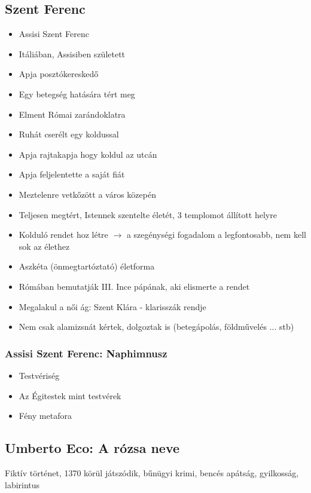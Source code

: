 \documentclass{article}
\begin{document}
\subsection{Szent Ferenc}
\begin{itemize}
    \item Assisi Szent Ferenc
    \item Itáliában, Assisiben született
    \item Apja posztókereskedő
    \item Egy betegség hatására tért meg
    \item Elment Római zarándoklatra
    \item Ruhát cserélt egy koldussal
    \item Apja rajtakapja hogy koldul az utcán
    \item Apja feljelentette a saját fiát 
    \item Meztelenre vetkőzött a város közepén 
    \item Teljesen megtért, Istennek szentelte életét, 3 templomot állított helyre
    \item Kolduló rendet hoz létre $\rightarrow$ a szegénységi fogadalom a legfontosabb, nem kell sok az élethez
    \item Aszkéta (önmegtartóztató) életforma
    \item Rómában bemutatják III. Ince pápának, aki elismerte a rendet
    \item Megalakul a női ág: Szent Klára - klarisszák rendje
    \item Nem csak alamizsnát kértek, dolgoztak is (betegápolás, földművelés ... stb)
\end{itemize}

\subsubsection{Assisi Szent Ferenc: Naphimnusz}
\begin{itemize}
    \item Testvériség
    \item Az Égitestek mint testvérek
    \item Fény metafora
\end{itemize}

\subsection{Umberto Eco: A rózsa neve}
Fiktív történet, 1370 körül játszódik, bűnügyi krimi, bencés apátság, gyilkosság, labirintus
\end{document}
